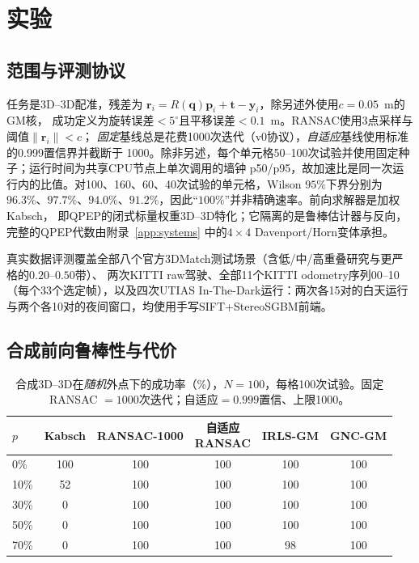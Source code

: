 \section{实验}
\label{sec:experiments}

\subsection{范围与评测协议}

任务是3D--3D配准，残差为
$\mathbf{r}_i=R(\mathbf{q})\mathbf{p}_i+\mathbf{t}-\mathbf{y}_i$，除另述外使用$c=0.05$~m的GM核，
成功定义为旋转误差$<5^\circ$且平移误差$<0.1$~m。RANSAC使用3点采样与阈值$\|\mathbf{r}_i\|<c$；
\emph{固定}基线总是花费1000次迭代（v0协议），\emph{自适应}基线使用标准的0.999置信界并截断于
1000。除非另述，每个单元格50--100次试验并使用固定种子；运行时间为共享CPU节点上单次调用的墙钟
p50/p95，故加速比是同一次运行内的比值。对100、160、60、40次试验的单元格，Wilson $95\%$下界分别为
$96.3\%$、$97.7\%$、$94.0\%$、$91.2\%$，因此“$100\%$”并非精确速率。前向求解器是加权Kabsch，
即QPEP的闭式标量权重3D--3D特化；它隔离的是鲁棒估计器与反向，完整的QPEP代数由附录~\ref{app:systems}
中的$4\times4$ Davenport/Horn变体承担。

真实数据评测覆盖全部八个官方3DMatch测试场景（含低/中/高重叠研究与更严格的$0.20$--$0.50$带）、
两次KITTI raw驾驶、全部11个KITTI odometry序列00--10（每个33个选定帧），以及四次UTIAS
In-The-Dark运行：两次各15对的白天运行与两个各10对的夜间窗口，均使用手写SIFT+StereoSGBM前端。

\subsection{合成前向鲁棒性与代价}

\begin{table}[t]
\caption{合成3D--3D在\emph{随机}外点下的成功率（\%），$N=100$，每格100次试验。固定RANSAC
$=1000$次迭代；自适应$=0.999$置信、上限1000。}
\label{tab:synthetic}
\centering
\scriptsize
\setlength{\tabcolsep}{2.2pt}
\begin{tabular}{lccccc}
\toprule
$p$ & Kabsch & RANSAC-1000 & \shortstack{自适应\\RANSAC} & IRLS-GM & GNC-GM \\
\midrule
0\%  & 100 & 100 & 100 & 100 & 100 \\
10\% & 52  & 100 & 100 & 100 & 100 \\
30\% & 0   & 100 & 100 & 100 & 100 \\
50\% & 0   & 100 & 100 & 100 & 100 \\
70\% & 0   & 100 & 100 & 98  & 100 \\
\bottomrule
\end{tabular}
\end{table}

